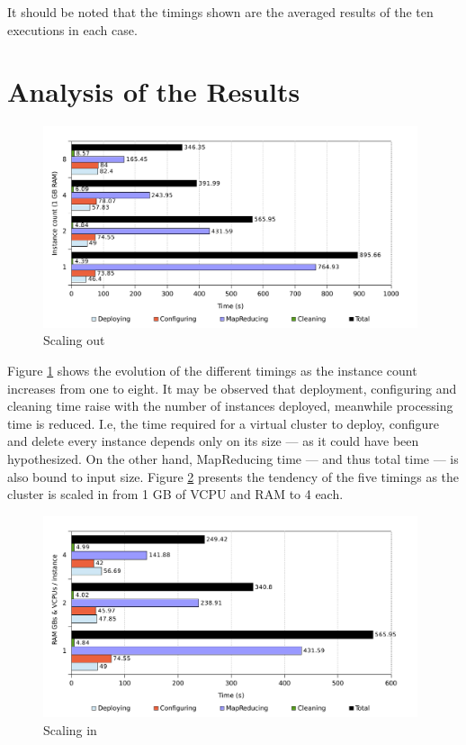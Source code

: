It should be noted that the timings shown are the averaged results of the ten executions in each case.

\section{Analysis of the Results}\label{sec:analisisresultados}

\begin{figure}[tbp]
\begin{center}
\includegraphics[width=0.98\textwidth]{imagenes/039.pdf}
\caption{Scaling out}
\label{fig:eschorizontal}
\end{center}
\end{figure}

\noindent Figure \ref{fig:eschorizontal} shows the evolution of the different timings as the instance count increases from one to eight. It may be observed that deployment, configuring and cleaning time raise with the number of instances deployed, meanwhile processing time is reduced. I.e, the time required for a virtual cluster to deploy, configure and delete every instance depends only on its size --- as it could have been hypothesized. On the other hand, MapReducing time --- and thus total time --- is also bound to input size. Figure \ref{fig:escvertical} presents the tendency of the five timings as the cluster is scaled in from 1 GB of VCPU and RAM to 4 each.

\begin{figure}[tbp]
\begin{center}
\includegraphics[width=0.98\textwidth]{imagenes/041.pdf}
\caption{Scaling in}
\label{fig:escvertical}
\end{center}
\end{figure}

